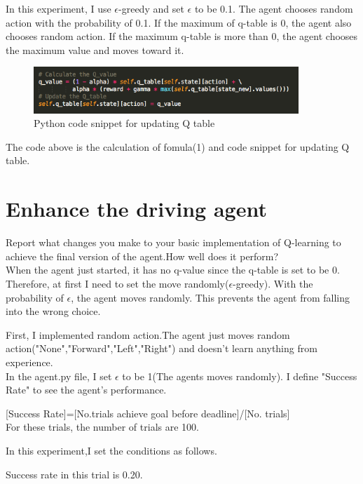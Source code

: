 \documentclass[a4paper,11pt]{article}
\begin{document}
In this experiment, I use $\epsilon$-greedy  and set $\epsilon$ to be 0.1. The agent chooses random action with the probability of 0.1. If the maximum of q-table is 0, the agent also chooses random action. If the maximum q-table is more than 0, the agent chooses the maximum value and moves toward it.


\begin{figure}[H]
\begin{center}
\includegraphics[width=100mm]{graph/python_code2.jpg}
\end{center}
\caption{Python code snippet for updating Q table}
\label{fig:2}
\end{figure}
The code above is the calculation of fomula(1) and code snippet for updating Q table.

\section{Enhance the driving agent}

Report what changes you make to your basic implementation of Q-learning to achieve the final version of the agent.How well does it perform?
\\
When the agent just started, it has no q-value since the q-table is set to be 0. Therefore, at first I need to set the move randomly($\epsilon$-greedy).
With the probability of $\epsilon$, the agent moves randomly. This prevents the agent from falling into the wrong choice. 



First, I implemented random action.The agent just moves random action("None","Forward","Left","Right") and doesn't learn anything from experience.
\\
In the agent.py file, I set $\epsilon$ to be 1(The agents moves randomly).
I define "Success Rate" to see the agent's performance.

[Success Rate]=[No.trials achieve goal before deadline]/[No. trials]
\\For these trials, the number of trials are 100.

In this experiment,I set the conditions as follows.


Success rate in this trial is 0.20.
\end{document}
